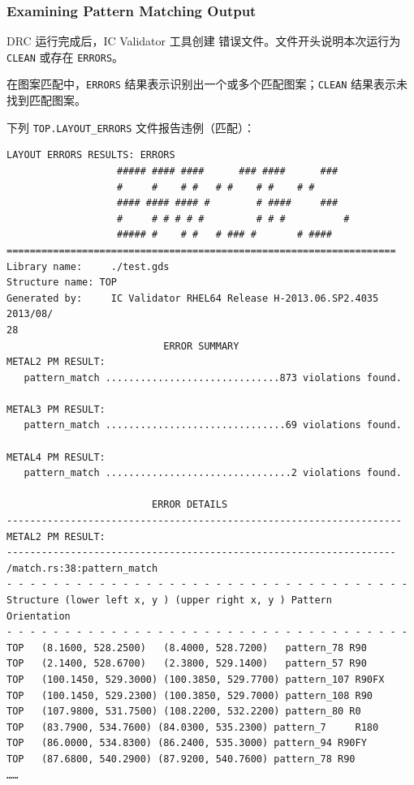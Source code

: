 \subsubsection*{Examining Pattern Matching Output}

DRC 运行完成后，IC Validator 工具创建  错误文件。文件开头说明本次运行为 \texttt{CLEAN} 或存在 \texttt{ERRORS}。

在图案匹配中，\texttt{ERRORS} 结果表示识别出一个或多个匹配图案；\texttt{CLEAN} 结果表示未找到匹配图案。

下列 \texttt{TOP.LAYOUT\_ERRORS} 文件报告违例（匹配）：
\begin{lstlisting}[style=shell]
                   LAYOUT ERRORS RESULTS: ERRORS
                   ##### #### ####      ### ####      ###
                   #     #    # #   # #    # #    # #
                   #### #### #### #        # ####     ###
                   #     # # # # #         # # #          #
                   ##### #    # #   # ### #       # ####
===================================================================
Library name:     ./test.gds
Structure name: TOP
Generated by:     IC Validator RHEL64 Release H-2013.06.SP2.4035 2013/08/
28
                           ERROR SUMMARY
METAL2 PM RESULT:
   pattern_match ..............................873 violations found.

METAL3 PM RESULT:
   pattern_match ...............................69 violations found.

METAL4 PM RESULT:
   pattern_match ................................2 violations found.

                         ERROR DETAILS
--------------------------------------------------------------------
METAL2 PM RESULT:
-------------------------------------------------------------------
/match.rs:38:pattern_match
- - - - - - - - - - - - - - - - - - - - - - - - - - - - - - - - - - -
Structure (lower left x, y ) (upper right x, y ) Pattern     Orientation
- - - - - - - - - - - - - - - - - - - - - - - - - - - - - - - - - - -
TOP   (8.1600, 528.2500)   (8.4000, 528.7200)   pattern_78 R90
TOP   (2.1400, 528.6700)   (2.3800, 529.1400)   pattern_57 R90
TOP   (100.1450, 529.3000) (100.3850, 529.7700) pattern_107 R90FX
TOP   (100.1450, 529.2300) (100.3850, 529.7000) pattern_108 R90
TOP   (107.9800, 531.7500) (108.2200, 532.2200) pattern_80 R0
TOP   (83.7900, 534.7600) (84.0300, 535.2300) pattern_7     R180
TOP   (86.0000, 534.8300) (86.2400, 535.3000) pattern_94 R90FY
TOP   (87.6800, 540.2900) (87.9200, 540.7600) pattern_78 R90
……
\end{lstlisting}

